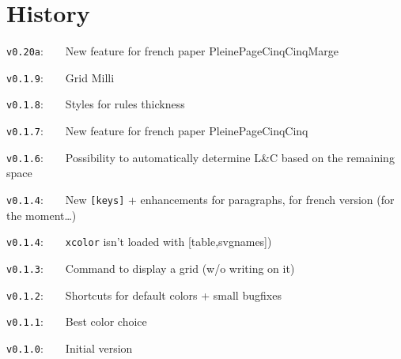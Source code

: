 \documentclass[a4paper]{article}
\begin{document}
\pagebreak

\part*{History}

\verb|v0.20a|:~~~~New feature for french paper \textsf{PleinePageCinqCinqMarge}

\verb|v0.1.9|:~~~~Grid \textsf{Milli}

\verb|v0.1.8|:~~~~Styles for rules thickness

\verb|v0.1.7|:~~~~New feature for french paper \textsf{PleinePageCinqCinq}

\verb|v0.1.6|:~~~~Possibility to automatically determine L\&C based on the remaining space

\verb|v0.1.4|:~~~~New \texttt{[keys]} + enhancements for paragraphs, for french version (for the moment\dots)

\verb|v0.1.4|:~~~~\texttt{xcolor} isn't loaded with \textsf{[table,svgnames]})

\verb|v0.1.3|:~~~~Command to display a grid (w/o writing on it)

\verb|v0.1.2|:~~~~Shortcuts for default colors + small bugfixes

\verb|v0.1.1|:~~~~Best color choice

\verb|v0.1.0|:~~~~Initial version
\end{document}
